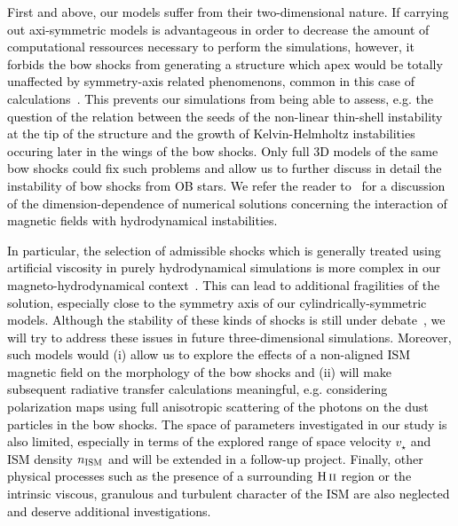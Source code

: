 \documentclass[useAMS,usenatbib]{mn2e}
\def\HII{\rm{H}\,{\textsc {ii}}}
\begin{document}
\textcolor{black}{
First and above, our models suffer from their two-dimensional nature. If 
carrying out axi-symmetric models is advantageous in order to decrease the 
amount of computational ressources necessary to perform the simulations, however, 
it forbids the bow shocks from generating a structure which apex would be 
totally unaffected by symmetry-axis related phenomenons, common in this case of 
calculations~\citep{meyer_mnras_459_2016}. This prevents our simulations from being able 
to assess, e.g. the question of the relation between the seeds of the non-linear 
thin-shell instability at the tip of the structure and the growth of 
Kelvin-Helmholtz instabilities occuring later in the wings of the bow shocks. 
Only full 3D models of the same bow shocks could fix such problems and 
allow us to further discuss in detail the instability of bow shocks from OB stars.
We refer the reader to~\citet{vanmarle_2015} for a discussion of the dimension-dependence 
of numerical solutions concerning the interaction of magnetic fields with hydrodynamical 
instabilities. 
}

\textcolor{black}{
In particular, the selection of admissible shocks which is generally treated 
using artificial viscosity in purely hydrodynamical simulations is more 
complex in our magneto-hydrodynamical context~\citep[see 
discussion in][]{ pogolerov_aa_354_2000}. This can lead to additional 
fragilities of the solution, especially close to the symmetry axis of our 
cylindrically-symmetric models. Although the stability of these kinds of shocks 
is still under debate~\citep{desterck_aipc_537_2000,desterck_2001}, we will try 
to address these issues in future three-dimensional simulations. 
Moreover, such models would (i) allow us to explore the effects of a non-aligned 
ISM magnetic field on the morphology of the bow shocks and (ii) will make 
subsequent radiative transfer calculations meaningful, e.g. considering 
polarization maps using full anisotropic scattering of the photons on the dust 
particles in the bow shocks. The space of parameters investigated in our study is 
also limited, especially in terms of the explored range of space velocity 
$v_{\star}$ and ISM density $n_{\rm ISM}$ and will be extended in a follow-up 
project. Finally, other physical processes such as the presence of a 
surrounding $\HII$ region or the intrinsic viscous, granulous and turbulent 
character of the ISM are also neglected and deserve additional investigations. 
}


\end{document}
